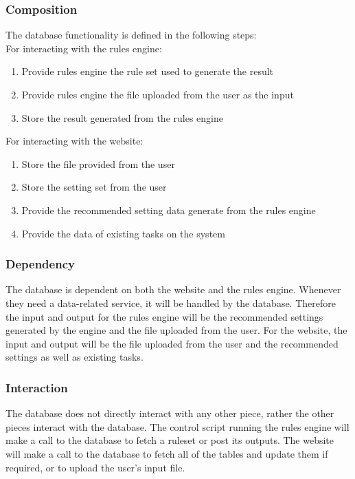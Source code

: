 \documentclass[draftclsnofoot,onecolumn,10pt,compsoc]{IEEEtran}
\begin{document}
\subsubsection{Composition}
The database functionality is defined in the following steps:\\
For interacting with the rules engine:
\begin{enumerate}
  \item Provide rules engine the rule set used to generate the result
  \item Provide rules engine the file uploaded from the user as the input
  \item Store the result generated from the rules engine
\end{enumerate}

For interacting with the website:
\begin{enumerate}
    \item Store the file provided from the user
    \item Store the setting set from the user
    \item Provide the recommended setting data generate from the rules engine
    \item Provide the data of existing tasks on the system
\end{enumerate}

\subsubsection{Dependency}
The database is dependent on both the website and the rules engine. Whenever they need a data-related service, it will be handled by the database. Therefore the input and output for the rules engine will be the recommended settings generated by the engine and the file uploaded from the user. For the website, the input and output will be the file uploaded from the user and the recommended settings as well as existing tasks.  

\subsubsection{Interaction}
The database does not directly interact with any other piece, rather the other pieces interact with the database. The control script running the rules engine will make a call to the database to fetch a ruleset or post its outputs. The website will make a call to the database to fetch all of the tables and update them if required, or to upload the user's input file.
\end{document}
